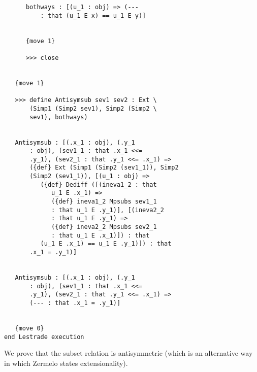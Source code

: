 \documentclass[12pt]{article}
\begin{document}
\begin{verbatim}
      bothways : [(u_1 : obj) => (--- 
          : that (u_1 E x) == u_1 E y)]


      {move 1}

      >>> close


   {move 1}

   >>> define Antisymsub sev1 sev2 : Ext \
       (Simp1 (Simp2 sev1), Simp2 (Simp2 \
       sev1), bothways)


   Antisymsub : [(.x_1 : obj), (.y_1 
       : obj), (sev1_1 : that .x_1 <<= 
       .y_1), (sev2_1 : that .y_1 <<= .x_1) => 
       ({def} Ext (Simp1 (Simp2 (sev1_1)), Simp2 
       (Simp2 (sev1_1)), [(u_1 : obj) => 
          ({def} Dediff ([(ineva1_2 : that 
             u_1 E .x_1) => 
             ({def} ineva1_2 Mpsubs sev1_1 
             : that u_1 E .y_1)], [(ineva2_2 
             : that u_1 E .y_1) => 
             ({def} ineva2_2 Mpsubs sev2_1 
             : that u_1 E .x_1)]) : that 
          (u_1 E .x_1) == u_1 E .y_1)]) : that 
       .x_1 = .y_1)]


   Antisymsub : [(.x_1 : obj), (.y_1 
       : obj), (sev1_1 : that .x_1 <<= 
       .y_1), (sev2_1 : that .y_1 <<= .x_1) => 
       (--- : that .x_1 = .y_1)]


   {move 0}
end Lestrade execution
\end{verbatim}

We prove that the subset relation is antisymmetric (which is an alternative way in which Zermelo states extensionality).
\end{document}
